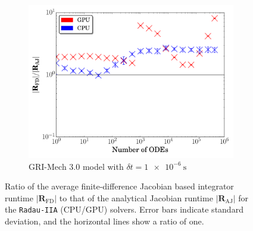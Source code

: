 \documentclass[preprint,review,11pt]{elsarticle}
\begin{document}
\begin{figure}[htb]
  \begin{subfigure}{0.49\textwidth}
      \includegraphics[width=\linewidth]{CH4_1e-06_ajac_comp.pdf}
      \caption{GRI-Mech 3.0 model with $\delta t = \SI{1e-6}{\second}$}
      \label{F:AJ_ch4_small}
  \end{subfigure}
  \caption{Ratio of the average finite-difference Jacobian based integrator runtime $\lvert\textbf{R}_{\text{FD}}\rvert$ to that of the analytical Jacobian runtime $\lvert\textbf{R}_{\text{AJ}}\rvert$ for the \texttt{Radau-IIA} (CPU\slash GPU) solvers.
  Error bars indicate standard deviation, and the horizontal lines show a ratio of one.}
  \label{F:AJ_comp}
\end{figure}

% 
\end{document}
